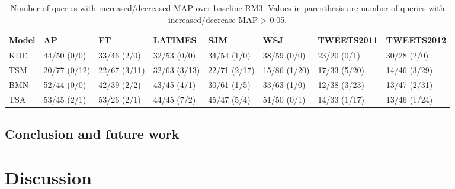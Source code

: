 \documentclass{sig-alternate}
\begin{document}
\begin{table*}[t]
\small
\caption{Number of queries with increased/decreased MAP over baseline RM3. Values in parenthesis are number of queries with increased/decrease MAP > 0.05. }
\begin{center}
\tabcolsep=0.11cm
\begin{tabular}{l | l | l | l | l | l | l | l}
\hline
\bf{Model}& \bf{AP} & \bf{FT} & \bf{LATIMES} & \bf{SJM} & \bf{WSJ} & \bf{TWEETS2011} & \bf{TWEETS2012} \\ \hline 
KDE & 44/50 (0/0)  & 33/46 (2/0)  & 32/53 (0/0)  & 34/54 (1/0)  & 38/59 (0/0)  & 23/20 (0/1)  & 30/28 (2/0) \\ \hline 
TSM & 20/77 (0/12)  & 22/67 (3/11)  & 32/63 (3/13)  & 22/71 (2/17)  & 15/86 (1/20)  & 17/33 (5/20)  & 14/46 (3/29) \\ \hline 
BMN & 52/44 (0/0)  & 42/39 (2/2)  & 43/45 (4/1)  & 30/61 (1/5)  & 33/63 (1/0)  & 12/38 (3/23)  & 13/47 (2/31) \\ \hline 
TSA & 53/45 (2/1)  & 53/26 (2/1)  & 44/45 (7/2)  & 45/47 (5/4)  & 51/50 (0/1)  & 14/33 (1/17)  & 13/46 (1/24) \\ \hline 
\end{tabular}
\end{center}
\label{table.posneg.rm3}
\normalsize
\end{table*}



\subsection{Conclusion and future work}


\section{Discussion}

  
 

\end{document}
